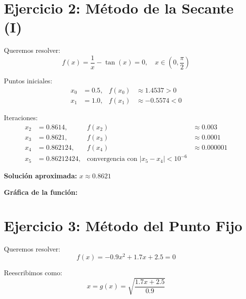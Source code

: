 \documentclass[12pt]{article}
\begin{document}
\section*{Ejercicio 2: Método de la Secante (I)}

Queremos resolver:
\[
    f(x) = \frac{1}{x} - \tan(x) = 0, \quad x \in (0, \frac{\pi}{2})
\]

Puntos iniciales:
\begin{align*}
    x_0 &= 0.5, & f(x_0) &\approx 1.4537 > 0 \\
    x_1 &= 1.0, & f(x_1) &\approx -0.5574 < 0
\end{align*}

Iteraciones:
\begin{align*}
    x_2 &= 0.8614, & f(x_2) &\approx 0.003 \\
    x_3 &= 0.8621, & f(x_3) &\approx 0.0001 \\
    x_4 &= 0.862124, & f(x_4) &\approx 0.000001 \\
    x_5 &= 0.86212424, & \text{convergencia con } |x_5 - x_4| < 10^{-6}
\end{align*}

\noindent\textbf{Solución aproximada:} \(\boxed{x \approx 0.8621}\)

\bigskip
\textbf{Gráfica de la función:}
\begin{center}
\end{center}

\section*{Ejercicio 3: Método del Punto Fijo}

Queremos resolver:
\[
    f(x) = -0.9x^2 + 1.7x + 2.5 = 0
\]

Reescribimos como:
\[
    x = g(x) = \sqrt{\frac{1.7x + 2.5}{0.9}}
\]
\end{document}
